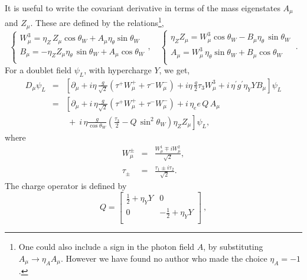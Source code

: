 \documentclass{ws-ijmpa}
\begin{document}
It is useful to write the covariant derivative in terms of the mass
eigenstates $A_\mu$ and $Z_\mu$.
These are defined by the relations\footnote{One
could also include a sign in the photon field $A$,
by substituting $A_\mu \rightarrow \eta_A A_\mu$.
However we have found no author who made the choice $\eta_A=-1$.}, 
%
\begin{equation}
  \label{eq:103}
  \left\{
    \begin{array}{l}
      W_\mu^3 = \eta_Z\, Z_\mu \cos\theta_W 
      + A_\mu \eta_\theta \sin\theta_W \\[+2mm]
      B_\mu= -\eta_Z Z_\mu \eta_\theta\,\sin\theta_W + A_\mu \cos\theta_W \\
    \end{array}
\right. , \quad
  \left\{
    \begin{array}{l}
    \eta_Z  Z_\mu = W_\mu^3 \cos\theta_W 
    - B_\mu \eta_\theta\,\sin\theta_W \\[+2mm]
      A_\mu=  W_\mu^3\, \eta_\theta \sin\theta_W + B_\mu \cos\theta_W \\
    \end{array}
\right. \ .
\end{equation}
%
For a doublet field $\psi_L$, with hypercharge $Y$, we get,
%
\begin{eqnarray}
D_\mu \psi_L
&=&
\left[ \partial_\mu + i\eta\, \frac{g}{\sqrt{2}} \left(
\tau^+ W_\mu^+ +  \tau^- W_\mu^- \right) +i\eta\, \frac{g}{2} \tau_3 W_\mu^3
+ i\, \eta^\prime g^\prime \eta_Y Y B_\mu \right] \psi_L
\nonumber\\[+2mm]
&=&
\left[ \partial_\mu + i\, \eta \frac{g}{\sqrt{2}} \left(
 \tau^+ W_\mu^+  +  \tau^- W_\mu^- \right) +i\, \eta_e e\, Q\,   A_\mu
\right.
\nonumber\\[+2mm]
& &
\left.
\ +\  i\, \eta \frac{g}{\cos\theta_W} \left(\frac{\tau_3}{2} - Q\, \sin^2\theta_W
\right) \eta_Z Z_\mu \right] \psi_L,
\label{eq:115}
\end{eqnarray}
%
where
%
\begin{eqnarray}
W_\mu^\pm &=&
\frac{W_\mu^1 \mp i W_\mu^2}{\sqrt{2}},
\label{eq:99}
\\
\tau_\pm &=&
\frac{\tau_1 \pm i \tau_2}{\sqrt{2}}.
\end{eqnarray}
%
The charge operator
is defined by
%
\begin{equation}
  \label{eq:104}
  Q = \left[
    \begin{matrix}
      \frac{1}{2} +\eta_Y Y & 0 \\[+2mm] 
      0&  -\frac{1}{2} +\eta_Y Y  \\[+2mm] 
    \end{matrix}
\right]\ ,
\end{equation}
\end{document}
